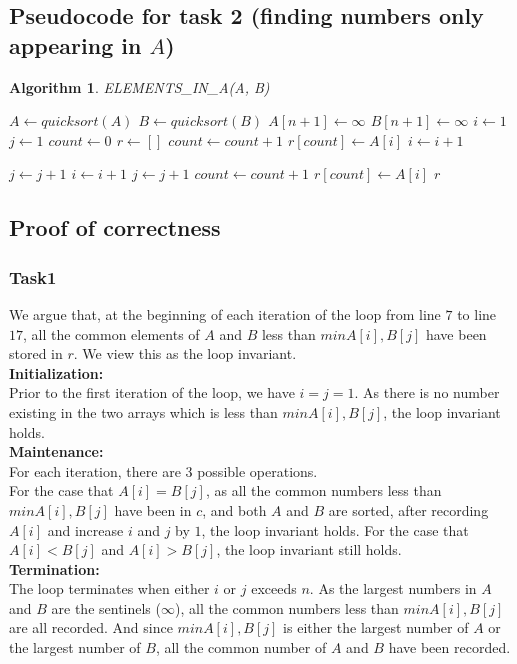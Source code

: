 \documentclass[letterpaper, 11pt]{article}
\newtheorem{algorithm}[lemma]{Algorithm}
\begin{document}
\subsection{Pseudocode for task 2 (finding numbers only appearing in $A$)}

\begin{algorithm}
\caption{ELEMENTS\_IN\_A(A, B)}
\begin{algorithmic}[1]
\STATE $A \leftarrow quicksort(A)$
\STATE $B \leftarrow quicksort(B)$
\STATE $A[n+1] \leftarrow \infty$
\STATE $B[n+1] \leftarrow \infty$
\STATE $i \leftarrow 1$
\STATE $j \leftarrow 1$
\STATE $count \leftarrow 0$
\STATE $r \leftarrow []$
        \STATE $count \leftarrow count + 1$
        \STATE $r[count] \leftarrow A[i]$
        \STATE $i \leftarrow i + 1$

        \STATE $j \leftarrow j + 1$
    \ELSE
        \STATE $i \leftarrow i + 1$
        \STATE $j \leftarrow j + 1$
    \ENDIF
\ENDWHILE
{}
    \STATE $count \leftarrow count + 1$
    \STATE $r[count] \leftarrow A[i]$
\ENDWHILE
\RETURN $r$
\end{algorithmic}
\end{algorithm}
\subsection{Proof of correctness}
\subsubsection{Task1}
We argue that, at the beginning of each iteration of the loop from line $7$ to line $17$, all the common elements of $A$ and $B$ less than $min{A[i], B[j]}$ have been stored in $r$. We view this as the loop invariant.\\
\textbf{Initialization:}\\
Prior to the first iteration of the loop, we have $i=j=1$. As there is no number existing in the two arrays which is less than $min{A[i], B[j]}$, the loop invariant holds.\\
\textbf{Maintenance:}\\
For each iteration, there are $3$ possible operations. \\
For the case that $A[i]=B[j]$, as all the common numbers less than $min{A[i], B[j]}$ have been in $c$, and both $A$ and $B$ are sorted, after recording $A[i]$ and increase $i$ and $j$ by $1$, the loop invariant holds.
For the case that $A[i]<B[j]$ and $A[i]>B[j]$, the loop invariant still holds.\\
\textbf{Termination:}\\
The loop terminates when either $i$ or $j$ exceeds $n$. As the largest numbers in $A$ and $B$ are the sentinels ($\infty$), all the common numbers less than $min{A[i], B[j]}$ are all recorded. And since $min{A[i], B[j]}$ is either the largest number of $A$ or the largest number of $B$, all the common number of $A$ and $B$ have been recorded.\\
\end{document}
